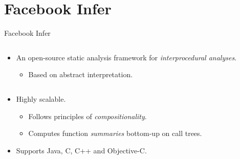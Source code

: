 \documentclass[10pt, hyperref={unicode}, aspectratio=169]{beamer}
\begin{document}
\section{Facebook Infer}
\begin{frame}{Facebook Infer}
    \begin{columns}
        \begin{column}{1 \linewidth}
            \begin{itemize}
                \item
                    An open-source \alert{static analysis framework}
                    for \emph{interprocedural analyses}.

                    \smallskip

                    \begin{itemize}\setlength\itemsep{1em}
                        \item
                            Based on \alert{abstract interpretation}.
                    \end{itemize}
            \end{itemize}
        \end{column}

        \hfill
    \end{columns}

    \begin{columns}
        \begin{column}{.55 \linewidth}
            \begin{itemize}\setlength\itemsep{2em}
                \item
                    \alert{Highly scalable}.

                    \smallskip

                    \begin{itemize}\setlength\itemsep{1em}
                        \item
                            Follows principles of \emph{compositionality}.

                        \item
                            Computes function \emph{summaries} bottom-up
                            on call trees.
                    \end{itemize}

                \item
                    Supports Java, C, C++ and Objective-C.
            \end{itemize}
        \end{column}


\end{columns}
\end{frame}
\end{document}
